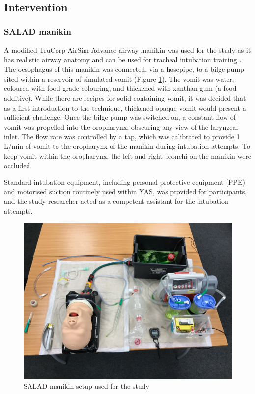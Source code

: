 \documentclass[]{article}
\begin{document}
\hypertarget{intervention}{%
\subsection{Intervention}\label{intervention}}

\hypertarget{salad-manikin}{%
\subsubsection{SALAD manikin}\label{salad-manikin}}

A modified TruCorp AirSim Advance airway manikin was used for the study
as it has realistic airway anatomy and can be used for tracheal
intubation training \citep{yang_comparison_2010}. The oesophagus of this
manikin was connected, via a hosepipe, to a bilge pump sited within a
reservoir of simulated vomit (Figure \ref{fig:figure1}). The vomit was
water, coloured with food-grade colouring, and thickened with xanthan
gum (a food additive). While there are recipes for solid-containing
vomit, it was decided that as a first introduction to the technique,
thickened opaque vomit would present a sufficient challenge. Once the
bilge pump was switched on, a constant flow of vomit was propelled into
the oropharynx, obscuring any view of the laryngeal inlet. The flow rate
was controlled by a tap, which was calibrated to provide 1 L/min of
vomit to the oropharynx of the manikin during intubation attempts. To
keep vomit within the oropharynx, the left and right bronchi on the
manikin were occluded.

Standard intubation equipment, including personal protective equipment
(PPE) and motorised suction routinely used within YAS, was provided for
participants, and the study researcher acted as a competent assistant
for the intubation attempts.

\begin{figure}
\includegraphics[width=7in]{images/figure-1} \caption{SALAD manikin setup used for the study}\label{fig:figure1}
\end{figure}
\end{document}
